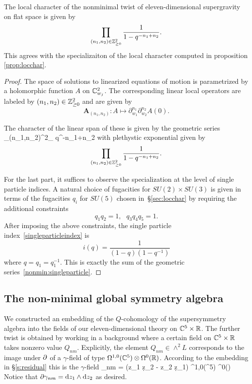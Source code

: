\begin{prop}
The  local character of the nonminimal twist of eleven-dimensional supergravity on flat space is given by
\[
\prod _{(n_1,n_2)\in \mathbb{Z}^2_{\geq 0}} \frac{1}{1-q^{-n_1+n_2}}.
\] 
This agrees with the specializaiton of the local character computed in proposition \ref{prop:locchar}.
\end{prop}
\begin{proof}
The space of solutions to linearized equations of motion is parametrized by a holomorphic function $A$ on $\mathbb{C}^2_{w_j}$. The corresponding linear local operators are labeled by $(n_1,n_2)\in \mathbb{Z}^2_{\geq 0}$  and are given by 
\[
\boldsymbol{A}_{(n_1,n_2)} : A \mapsto \partial_{w_1}^{n_1}\partial_{w_2}^{n_2} A (0).
\]

The character of the linear span of these is given by the geometric series
\beqn\label{nonmin:singleparticle}
\sum _{(n_1,n_2)\in \Z^2_{}} q^{-n_1+n_2}
\eeqn
with plethystic exponential given by 
\[
\prod _{(n_1,n_2)\in \mathbb{Z}^2_{\geq 0}} \frac{1}{1-q^{-n_1+n_2}}.
\]

For the last part, it suffices to observe the specialization at the level of single particle indices. A natural choice of fugacities for $SU(2)\times SU(3)$ is given in terms of the fugacities $q_i$ for $SU(5)$ chosen in~\S\ref{sec:locchar} by requiring the additional constraints \[q_1q_2 = 1, \ \ \ q_3q_4q_5=1.\]
After imposing the above constraints, the single particle index~\eqref{singleparticleindex} is
\[
i(q) = \frac{1}{(1-q)(1-q^{-1})}
\]
where $q = q_1=q_1^{-1}$. This is exactly the sum of the geometric series~\eqref{nonmin:singleparticle}.
\end{proof}


%

\subsection{The non-minimal global symmetry algebra}

We constructed an embedding of the $Q$-cohomology of the supersymmetry algebra into the fields of our eleven-dimensional theory on $\mathbb C^5 \times \mathbb R$. 
The further twist is obtained by working in a background where a certain field on $\mathbb C^5 \times \mathbb R$ takes nonzero value $Q_{nm}$. 
Explicitly, the element $Q_{nm} \in \wedge^2 L$ corresponds to the image under $\partial$ of a $\gamma$-field of type $\Omega^{1,0}(\mathbb C^5) \otimes \Omega^0(\mathbb R)$. 
According to the embedding in \S \ref{s:residual} this is the $\gamma$-field 
\beqn\label{eqn:gammanm}
\gamma_{nm} =  (z_1 \d z_2 - z_2 \d z_1) \in \Omega^{1,0}(\CC^5) \otimes \Omega^0(\RR) 
\eeqn
Notice that $\partial \gamma_{nm} = {\rm d} z_1 \wedge {\rm d} z_2$ as desired.

